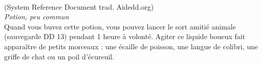\\
{\small (System Reference Document trad. Aidedd.org)}\\
{\small \it Potion, peu commun}\\
Quand vous buvez cette potion, vous pouvez lancer le sort amitié animale (sauvegarde DD 13) pendant 1 heure à volonté. Agiter ce liquide boueux fait apparaître de petits morceaux : une écaille de poisson, une langue de colibri, une griffe de chat ou un poil d'écureuil. \\

